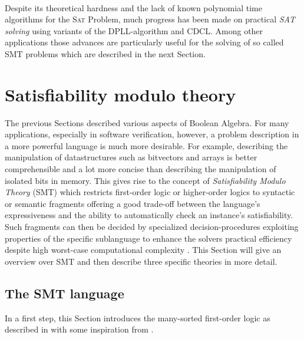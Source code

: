 \paragraph{}
Despite its theoretical hardness and the lack of known polynomial time algorithms for the \textsc{Sat} Problem, much progress has been made on practical \textit{SAT solving} using variants of the DPLL-algorithm and CDCL.
Among other applications those advances are particularly useful for the solving of so called SMT problems which are described in the next Section.


\section{Satisfiability modulo theory}
The previous Sections described various aspects of Boolean Algebra.
For many applications, especially in software verification, however, a problem description in a more powerful language is much more desirable. For example, describing the manipulation of datastructures such as bitvectors and arrays is better comprehensible and a lot more concise than describing the manipulation of isolated bits in memory.
This gives rise to the concept of \textit{Satisfiability Modulo Theory} (SMT) which restricts first-order logic or higher-order logics to syntactic or semantic fragments offering a good trade-off between the language's expressiveness and the ability to automatically check an instance's satisfiability.
Such fragments can then be decided by specialized decision-procedures exploiting properties of the specific sublanguage to enhance the solvers practical efficiency despite high worst-case computational complexity \cite{Barrett-Tinelli-SMT}. This Section will give an overview over SMT and then describe three specific theories in more detail.

\subsection{The SMT language}
In a first step, this Section introduces the many-sorted first-order logic as described in \cite{Barrett-Tinelli-SMT} with some inspiration from \cite{fondements-logique}.

